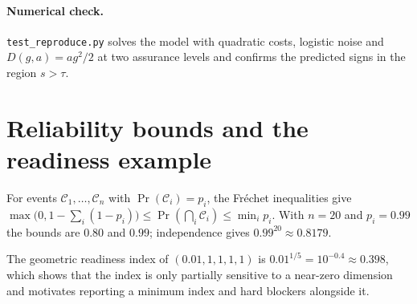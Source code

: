 \documentclass[11pt,a4paper]{article}
\begin{document}
\paragraph{Numerical check.} \texttt{test\_reproduce.py} solves the model with quadratic costs,
logistic noise and $D(g,a)=ag^{2}/2$ at two assurance levels and confirms the predicted signs in the
region $s>\tau$.

\section{Reliability bounds and the readiness example}

For events $\mathcal{C}_1,\dots,\mathcal{C}_n$ with $\Pr(\mathcal{C}_i)=p_i$, the Fr\'echet
inequalities give
$\max\bigl(0,1-\sum_i(1-p_i)\bigr)\le\Pr(\bigcap_i\mathcal{C}_i)\le\min_ip_i$. With $n=20$ and
$p_i=0.99$ the bounds are $0.80$ and $0.99$; independence gives $0.99^{20}\approx 0.8179$.

The geometric readiness index of $(0.01,1,1,1,1)$ is $0.01^{1/5}=10^{-0.4}\approx 0.398$, which shows
that the index is only partially sensitive to a near-zero dimension and motivates reporting a minimum
index and hard blockers alongside it.
\end{document}
